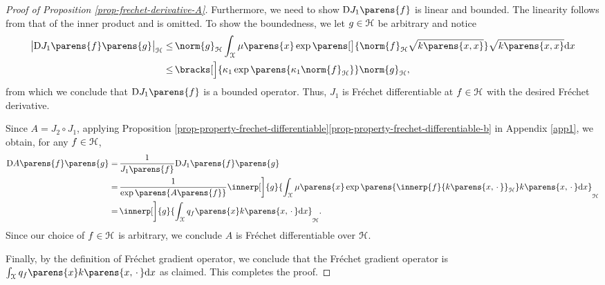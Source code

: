 \begin{proof}[Proof of Proposition \ref{prop-frechet-derivative-A}]
	Furthermore, we need to show $\Diff J_1 \parens{f}$ is linear and bounded. The linearity follows from that of the inner product and is omitted. To show the boundedness, we let $g \in \mathcal{H}$ be arbitrary and notice 
	\begin{align*}
		\abs[\big]{\Diff J_1 \parens{f} \parens{g}}_{\calH} 
		\le & \, \norm{g}_{\calH} \int_{\calX} \mu \parens{x} \exp \parens[\big]{\norm{f}_{\calH} \sqrt{k \parens{x, x}} } \sqrt{k \parens{x, x}} \diff x \nonumber \\ 
		\le & \, \bracks[\Big]{\kappa_1 \exp \parens{ \kappa_1 \norm{f}_{\calH} }} \norm{g}_{\calH}, 
	\end{align*}
	from which we conclude that $\Diff J_1 \parens{f}$ is a bounded operator. Thus, $J_1$ is Fr{\'e}chet differentiable at $f \in \mathcal{H}$ with the desired Fr{\'e}chet derivative. 
	
	Since $A = J_2 \circ J_1$, applying Proposition \ref{prop-property-frechet-differentiable}\ref{prop-property-frechet-differentiable-b} in Appendix \ref{app1}, we obtain, for any $f \in \mathcal{H}$, 
	\begin{align*}
		\Diff A \parens{f} \parens{g} 
		= & \, \frac{1}{J_1 \parens{f}} \Diff J_1 \parens{f} \parens{g} \\ 
		= & \, \frac{1}{\exp \parens{A \parens{f}}} \innerp[\bigg]{g}{\int_{\calX} \mu \parens{x} \exp \parens{\innerp{f}{k \parens{x, \,\cdot\,}}_{\calH}} k \parens{x, \,\cdot\,} \diff x}_{\calH} \\ 
		= & \, \innerp[\bigg]{g}{\int_{\calX} q_f \parens{x} k \parens{x, \,\cdot\,} \diff x} _{\calH}. 
	\end{align*}
	Since our choice of $f \in \mathcal{H}$ is arbitrary, we conclude $A$ is Fr{\'e}chet differentiable over $\mathcal{H}$. 
	
	Finally, by the definition of Fr{\'e}chet gradient operator, we conclude that the Fr{\'e}chet gradient operator is $\int_{\calX} q_f \parens{x} k \parens{x, \,\cdot\,} \diff x$ as claimed. This completes the proof. 
	
\end{proof}

